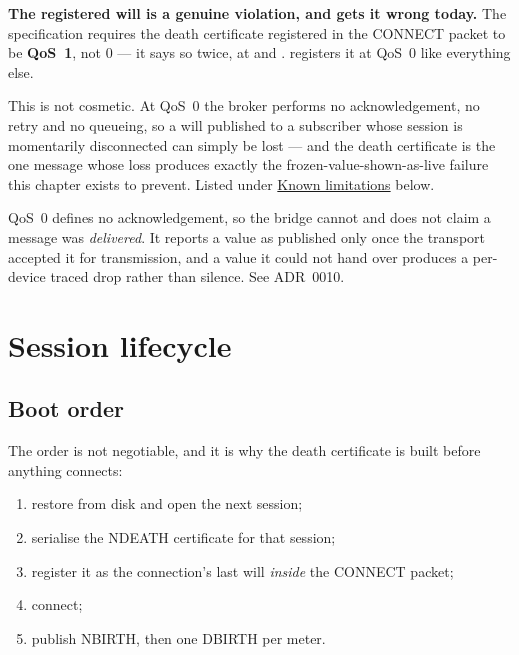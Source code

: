 \begin{note}
\textbf{The registered will is a genuine violation, and \prog gets it wrong today.} The
specification requires the death certificate registered in the CONNECT packet to be
\textbf{QoS~1}, not 0 --- it says so twice, at
 and
. \prog registers it at QoS~0 like everything
else.

This is not cosmetic. At QoS~0 the broker performs no acknowledgement, no retry and no
queueing, so a will published to a subscriber whose session is momentarily disconnected can
simply be lost --- and the death certificate is the one message whose loss produces exactly
the frozen-value-shown-as-live failure this chapter exists to prevent. Listed under
\hyperref[sec:contract-limits]{Known limitations} below.
\end{note}

\begin{note}
QoS~0 defines no acknowledgement, so the bridge cannot and does not claim a message was
\emph{delivered}. It reports a value as published only once the transport accepted it for
transmission, and a value it could not hand over produces a per-device traced drop rather
than silence. See ADR~0010.
\end{note}

\section{Session lifecycle}

\subsection{Boot order}

The order is not negotiable, and it is why the death certificate is built before anything
connects:

\begin{enumerate}
  \item restore  from disk and open the next session;
  \item serialise the NDEATH certificate for that session;
  \item register it as the connection's last will \emph{inside} the CONNECT packet;
  \item connect;
  \item publish NBIRTH, then one DBIRTH per meter.
\end{enumerate}

